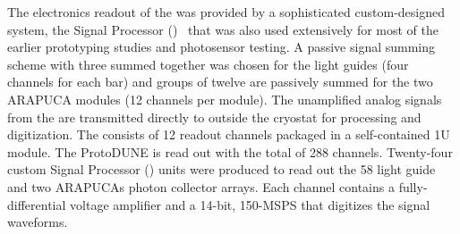 The electronics readout of the   was provided by a sophisticated custom-designed system, the  Signal Processor ()~ that was also used extensively for most of the earlier prototyping studies and photosensor testing.
A passive signal summing scheme with three  summed together was chosen for the light guides (four  channels for each bar) and groups of twelve  are passively summed for the two ARAPUCA modules (12  channels per module).
The unamplified analog signals from the  are transmitted directly to outside the cryostat for processing and digitization. The  consists of 12 readout channels packaged in 
a self-contained 1U module. The ProtoDUNE  is read out with the total of 288  channels. 
Twenty-four custom  Signal Processor () units were produced to read out the 58 light guide and two ARAPUCAs photon collector arrays.
Each channel contains a fully-differential voltage amplifier and a \num{14}-bit, \num{150}-MSPS  that digitizes the  signal waveforms.


